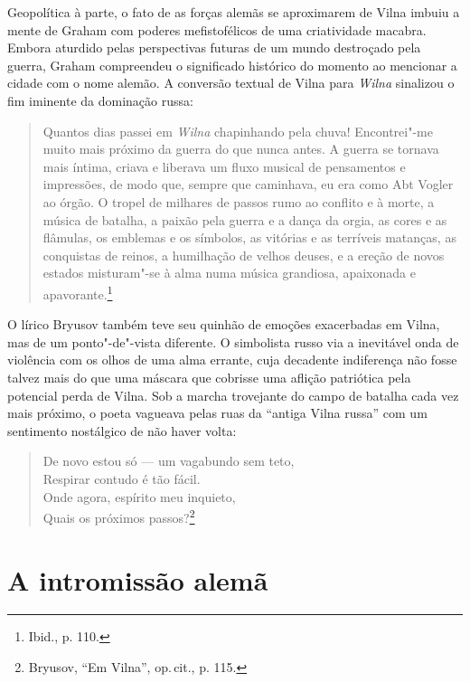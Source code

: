 Geopolítica à parte, o fato de as forças alemãs se aproximarem de Vilna
imbuiu a mente de Graham com poderes mefistofélicos de uma criatividade
macabra. Embora aturdido pelas perspectivas futuras de um mundo
destroçado pela guerra, Graham compreendeu o significado histórico do
momento ao mencionar a cidade com o nome alemão. A conversão textual de
Vilna para \textit{Wilna} sinalizou o fim iminente da dominação russa:

\begin{quote}
Quantos dias passei em \textit{Wilna} chapinhando pela chuva! Encontrei"-me muito
mais próximo da guerra do que nunca antes. A guerra se tornava mais
íntima, criava e liberava um fluxo musical de pensamentos e impressões,
de modo que, sempre que caminhava, eu era como Abt Vogler ao órgão. O
tropel de milhares de passos rumo ao conflito e à morte, a música de
batalha, a paixão pela guerra e a dança da orgia, as cores e as
flâmulas, os emblemas e os símbolos, as vitórias e as terríveis
matanças, as conquistas de reinos, a humilhação de velhos deuses, e a
ereção de novos estados misturam"-se à alma numa música grandiosa,
apaixonada e apavorante.\footnote{Ibid., p. 110.}
\end{quote}

O lírico Bryusov também teve seu quinhão de emoções exacerbadas em
Vilna, mas de um ponto"-de"-vista diferente. O simbolista russo via a
inevitável onda de violência com os olhos de uma alma errante, cuja
decadente indiferença não fosse talvez mais do que uma máscara que
cobrisse uma aflição patriótica pela potencial perda de Vilna. Sob a
marcha trovejante do campo de batalha cada vez mais próximo, o poeta
vagueava pelas ruas da ``antiga Vilna russa'' com um sentimento
nostálgico de não haver volta:

\begin{verse}
De novo estou só --- um vagabundo sem teto,\\
Respirar contudo é tão fácil.\\
Onde agora, espírito meu inquieto,\\
Quais os próximos passos?\footnote{Bryusov, ``Em Vilna'', op.\,cit., p. 115.}
\end{verse}

%

\chapter{A intromissão alemã}

